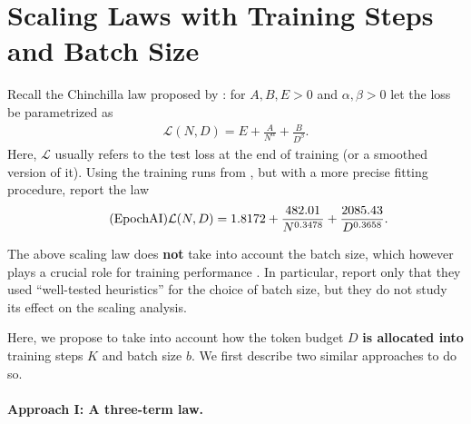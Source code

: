 \documentclass[12pt,a4paper,twoside]{article}
\begin{document}
\section{Scaling Laws with Training Steps and Batch Size}\label{sec:bs-step-scaling-laws}


Recall the Chinchilla law proposed by \citet{Hoffmann2022}: for $A,B,E >0$ and $\alpha, \beta > 0$ let the loss be parametrized as
\begin{align*}
    \mathcal{L}(N,D) = E + \frac{A}{N^\alpha} + \frac{B}{D^\beta}.
\end{align*}
Here, $\mathcal{L}$ usually refers to the test loss at the end of training (or a smoothed version of it). Using the training runs from \citet{Hoffmann2022}, but with a more precise fitting procedure, \citet{Besiroglu2024} report the law
\begin{align}\label{epochai-law} \tag{\text{EpochAI}}
    \mathcal{L}(N,D) = 1.8172 + \frac{482.01}{N^{0.3478}} + \frac{2085.43}{D^{0.3658}}.
\end{align}
%

The above scaling law does \textbf{not} take into account the batch size, which however plays a crucial role for training performance \citep{Bergsma2025,Zhang2025}. In particular, \citet{Hoffmann2022} report only that they used ``well-tested heuristics'' for the choice of batch size, but they do not study its effect on the scaling analysis. 

Here, we propose to take into account how the token budget $D$ \textbf{is allocated into} training steps $K$ and batch size $b$. We first describe two similar approaches to do so.


\paragraph{Approach I: A three-term law.}
\end{document}

